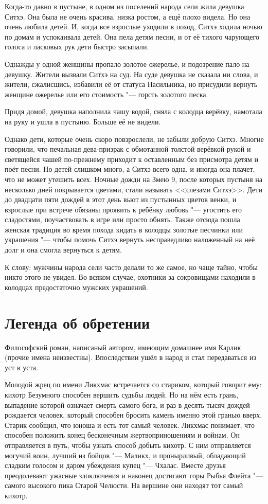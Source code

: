 \documentclass[a4paper,10pt,fleqn]{book}
\begin{document}
Когда-то давно в пустыне, в одном из поселений народа сели жила девушка Ситхэ.
Она была не очень красива, низка ростом, а ещё плохо видела.
Но она очень любила детей.
И, когда все взрослые уходили в поход, Ситхэ ходила ночью по домам и успокаивала детей.
Она пела детям песни, и от её тихого чарующего голоса и ласковых рук дети быстро засыпали.

Однажды у одной женщины пропало золотое ожерелье, и подозрение пало на девушку.
Жители вызвали Ситхэ на суд.
На суде девушка не сказала ни слова, и жители, сжалисшись, избавили её от статуса Насильника, но присудили вернуть женщине ожерелье или его стоимость "--- горсть золотого песка.

Придя домой, девушка наполнила чашу водой, сняла с колодца верёвку, намотала на руку и ушла в пустыню.
Больше её не видели.

Однако дети, которые очень скоро повзрослели, не забыли добрую Ситхэ.
Многие говорили, что печальная дева-призрак с обмотанной толстой верёвкой рукой и светящейся чашей по-прежнему приходит к оставленным без присмотра детям и поёт песни.
Но детей слишком много, а Ситхэ всего одна, и иногда она плачет, что не может утешить всех.
Ночные дожди на Змею 9, после которых пустыня на несколько дней покрывается цветами, стали называть <<слезами Ситхэ>>.
Дети до двадцати пяти дождей в этот день вьют из пустынных цветов венки, и взрослые при встрече обязаны проявить к ребёнку любовь "--- угостить его сладостями, поучаствовать в игре или просто обнять.
Также отсюда пошла женская традиция во время похода кидать в колодцы золотые песчинки или украшения "--- чтобы помочь Ситхэ вернуть несправедливо наложенный на неё долг и она смогла вернуться к детям.

К слову: мужчины народа сели часто делали то же самое, но чаще тайно, чтобы никто этого не увидел.
Во всяком случае, охотники за сокровищами находили в колодцах предостаточно мужских украшений.

\section{Легенда об обретении}

Философский роман, написаный автором, имеющим домашнее имя Карлик (прочие имена неизвестны).
Впоследствии ушёл в народ и стал передаваться из уст в уста.

Молодой жрец по имени Ликхмас встречается со стариком, который говорит ему: кихотр Безумного способен вершить судьбы людей.
Но на нём есть грань, выпадение которой означает смерть самого бога, и раз в десять тысяч дождей рождается человек, который способен бросить камень именно этой гранью вверх.
Старик сообщил, что юноша и есть тот самый человек.
Ликхмас понимает, что способен положить конец бесконечным жертвоприношениям и войнам.
Он отправляется в путь, чтобы узнать способ добыть кихотр.
С ним отправляется могучий воин, лучший из бойцов "--- Маликх, и пронырливый, обладающий сладким голосом и даром убеждения купец "--- Чхалас.
Вместе друзья преодолевают ужасные злоключения и наконец достигают горы Рыбья Флейта "--- самого высокого пика Старой Челюсти.
На вершине они находят тот самый кихотр.
\end{document}
